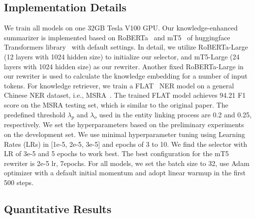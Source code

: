 \subsection{Implementation Details}
We train all models on one 32GB Tesla V100 GPU. Our knowledge-enhanced summarizer is implemented based on RoBERTa~\cite{Liu2019RoBERTaAR} and mT5~\cite{Xue2021mT5AM} of huggingface Transformers library~\cite{wolf-etal-2020-transformers} with default settings.
In detail, we utilize RoBERTa-Large (12 layers with 1024 hidden size) to initialize our selector, and mT5-Large (24 layers with 1024 hidden size) as our rewriter. Another fixed RoBERTa-Large in our rewriter is used to calculate the knowledge embedding for a number of input tokens.
For knowledge retriever, we train a FLAT~\cite{Li2020FLATCN} NER model on a general Chinese NER dataset, i.e., MSRA~\cite{Levow2006TheTI}. The trained FLAT model achieves 94.21 F1 score on the MSRA testing set, which is similar to the original paper. The predefined threshold $\lambda_{p}$ and $\lambda_{o}$ used in the entity linking process are 0.2 and 0.25, respectively.
We set the hyperparameters based on the preliminary experiments on the development set. We use minimal hyperparameter tuning using Learning Rates (LRs) in [1e-5, 2e-5, 3e-5] and epochs of 3 to 10. We find the selector with LR of 3e-5 and 5 epochs to work best. The best configuration for the mT5 rewriter is 2e-5 lr, 7epochs. For all models, we set the batch size to 32, use Adam optimizer with a default initial momentum and adopt linear warmup in the first 500 steps.

\subsection{Quantitative Results}
